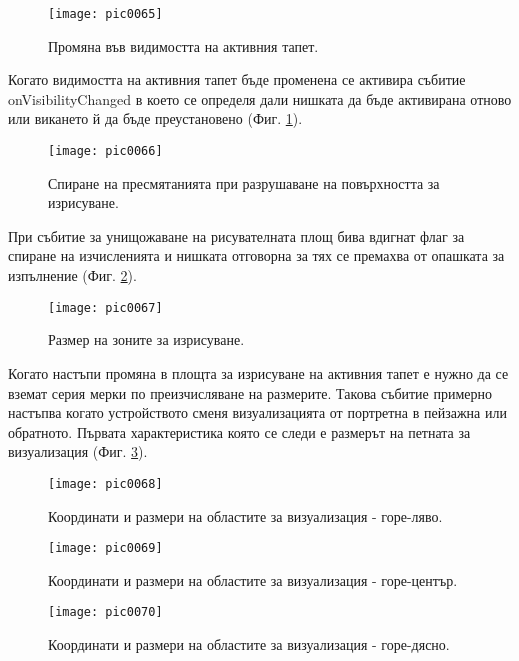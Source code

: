 \begin{figure}[h]
  \centering
  \texttt{[image: pic0065]}
  \caption{Промяна във видимостта на активния тапет.}
\label{fig:pic0065}
\end{figure}
\FloatBarrier

Когато видимостта на активния тапет бъде променена се активира събитие onVisibilityChanged в което се определя дали нишката да бъде активирана отново или викането й да бъде преустановено (Фиг. \ref{fig:pic0065}).

\begin{figure}[h]
  \centering
  \texttt{[image: pic0066]}
  \caption{Спиране на пресмятанията при разрушаване на повърхността за изрисуване.}
\label{fig:pic0066}
\end{figure}
\FloatBarrier

При събитие за унищожаване на рисувателната площ бива вдигнат флаг за спиране на изчисленията и нишката отговорна за тях се премахва от опашката за изпълнение (Фиг. \ref{fig:pic0066}).

\begin{figure}[h]
  \centering
  \texttt{[image: pic0067]}
  \caption{Размер на зоните за изрисуване.}
\label{fig:pic0067}
\end{figure}
\FloatBarrier

Когато настъпи промяна в площта за изрисуване на активния тапет е нужно да се вземат серия мерки по преизчисляване на размерите. Такова събитие примерно настъпва когато устройството сменя визуализацията от портретна в пейзажна или обратното. Първата характеристика която се следи е размерът на петната за визуализация (Фиг. \ref{fig:pic0067}).


\begin{figure}[h]
  \centering
  \texttt{[image: pic0068]}
  \caption{Координати и размери на областите за визуализация - горе-ляво.}
\label{fig:pic0068}
\end{figure}
\FloatBarrier

\begin{figure}[h]
  \centering
  \texttt{[image: pic0069]}
  \caption{Координати и размери на областите за визуализация - горе-център.}
\label{fig:pic0069}
\end{figure}
\FloatBarrier

\begin{figure}[h]
  \centering
  \texttt{[image: pic0070]}
  \caption{Координати и размери на областите за визуализация - горе-дясно.}
\label{fig:pic0070}
\end{figure}
\FloatBarrier

